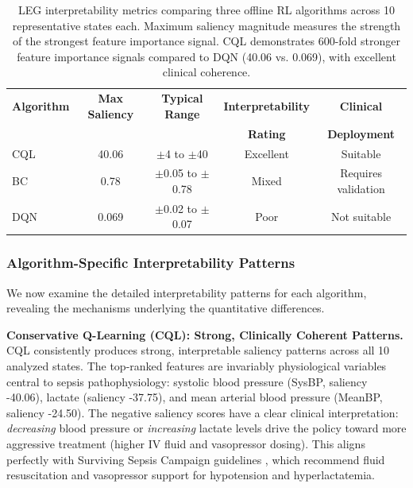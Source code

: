 \begin{table}[htbp]
\centering
\caption{LEG interpretability metrics comparing three offline RL algorithms across 10 representative states each. Maximum saliency magnitude measures the strength of the strongest feature importance signal. CQL demonstrates 600-fold stronger feature importance signals compared to DQN (40.06 vs. 0.069), with excellent clinical coherence.}
\label{tab:interpretability-metrics}
\begin{tabular}{lcccc}
\toprule
\textbf{Algorithm} & \textbf{Max Saliency} & \textbf{Typical Range} & \textbf{Interpretability} & \textbf{Clinical} \\
                   &                       &                        & \textbf{Rating}           & \textbf{Deployment} \\
\midrule
CQL                & 40.06                 & $\pm$4 to $\pm$40      & Excellent                 & Suitable \\
BC                 & 0.78                  & $\pm$0.05 to $\pm$0.78 & Mixed                     & Requires validation \\
DQN                & 0.069                 & $\pm$0.02 to $\pm$0.07 & Poor                      & Not suitable \\
\bottomrule
\end{tabular}
\end{table}


\subsubsection{Algorithm-Specific Interpretability Patterns}

We now examine the detailed interpretability patterns for each algorithm, revealing the mechanisms underlying the quantitative differences.

\textbf{Conservative Q-Learning (CQL): Strong, Clinically Coherent Patterns.} CQL consistently produces strong, interpretable saliency patterns across all 10 analyzed states. The top-ranked features are invariably physiological variables central to sepsis pathophysiology: systolic blood pressure (SysBP, saliency -40.06), lactate (saliency -37.75), and mean arterial blood pressure (MeanBP, saliency -24.50). The negative saliency scores have a clear clinical interpretation: \textit{decreasing} blood pressure or \textit{increasing} lactate levels drive the policy toward more aggressive treatment (higher IV fluid and vasopressor dosing). This aligns perfectly with Surviving Sepsis Campaign guidelines \citep{rhodes2017ssc}, which recommend fluid resuscitation and vasopressor support for hypotension and hyperlactatemia.

